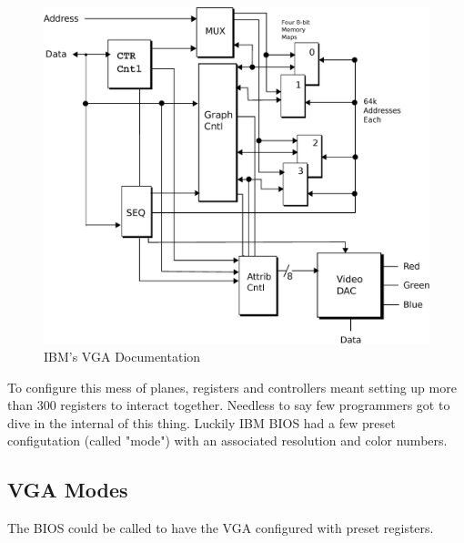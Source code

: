 \documentclass[book.tex]{subfiles}
\begin{document}
 
 \begin{figure}[H]
\centering
\includegraphics[scale=0.38]{imgs/ibm_vga.eps}
%
\caption{IBM's VGA Documentation}
\label{fig:ibm_vga}
\end{figure}

\bigskip
To configure this mess of planes, registers and controllers meant setting up more than 300 registers to interact together. Needless to say few programmers got to dive in the internal of this thing. Luckily IBM BIOS had a few preset configutation (called "mode") with an associated resolution and color numbers.

\subsection{VGA Modes}

The BIOS could be called to have the VGA configured with preset registers.
\end{document}
